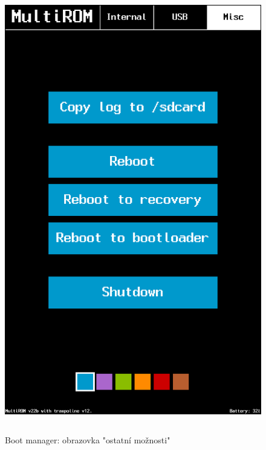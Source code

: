 \documentclass[12pt, a4paper, oneside]{article}
\begin{document}
\begin{figure}[H]
\begin{center}
 \includegraphics[height=550pt]{../img/boot_manager_misc.png}
\caption{Boot manager: obrazovka "ostatní možnosti"}
\end{center}
\end{figure}
\end{document}
